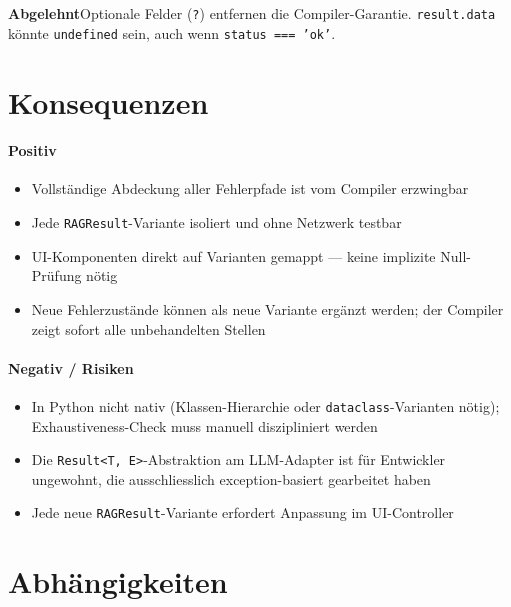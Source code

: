 \documentclass[a4paper, 11pt, oneside]{report}
\newcommand{\code}[1]{\texttt{\small #1}}
\newcommand{\abgelehnt}{\colorbox{depbg}{\small\bfseries\color{warnframe}Abgelehnt}\;}
\begin{document}
\abgelehnt Optionale Felder (\code{?}) entfernen die Compiler-Garantie.
\code{result.data} könnte \code{undefined} sein, auch wenn
\code{status === 'ok'}.

\section{Konsequenzen}

\paragraph{Positiv}
\begin{itemize}
  \item Vollständige Abdeckung aller Fehlerpfade ist vom Compiler erzwingbar
  \item Jede \code{RAGResult}-Variante isoliert und ohne Netzwerk testbar
  \item UI-Komponenten direkt auf Varianten gemappt --- keine implizite
        Null-Prüfung nötig
  \item Neue Fehlerzustände können als neue Variante ergänzt werden;
        der Compiler zeigt sofort alle unbehandelten Stellen
\end{itemize}

\paragraph{Negativ / Risiken}
\begin{itemize}
  \item In Python nicht nativ (Klassen-Hierarchie oder \code{dataclass}-Varianten
        nötig); Exhaustiveness-Check muss manuell diszipliniert werden
  \item Die \code{Result<T, E>}-Abstraktion am LLM-Adapter ist für Entwickler
        ungewohnt, die ausschliesslich exception-basiert gearbeitet haben
  \item Jede neue \code{RAGResult}-Variante erfordert Anpassung im UI-Controller
\end{itemize}

\section{Abhängigkeiten}
\end{document}
